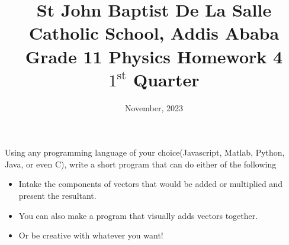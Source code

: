 \documentclass[12pt,addpoints]{exam}
\date{November, 2023}
\begin{document}
	\title{St John Baptist De La Salle Catholic School, Addis Ababa\\
		\large Grade 11 Physics Homework 4\\
		$1^\text{st}$ Quarter}
	\maketitle
	\begin{questions}
		\question Using any programming language of your choice(Javascript, Matlab, Python, Java, or even C), write a short program that can do either of the following
		\begin{itemize}
			\item Intake the components of vectors that would be added or multiplied and present the resultant.
			\item You can also make a program that visually adds vectors together.
			\item Or be creative with whatever you want!
		\end{itemize}
	\end{questions}	
\end{document}
